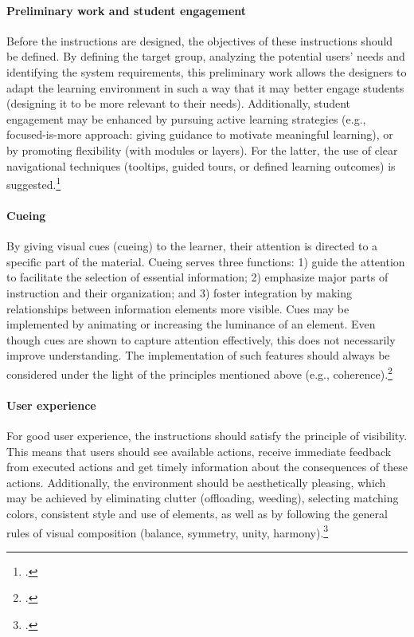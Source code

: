\paragraph{Preliminary work and student engagement} Before the instructions are designed, the objectives of these instructions should be defined. By defining the target group, analyzing the potential users' needs and identifying the system requirements, this preliminary work allows the designers to adapt the learning environment in such a way that it may better engage students (designing it to be more relevant to their needs). Additionally, student engagement may be enhanced by pursuing active learning strategies (e.g., focused-is-more approach: giving guidance to motivate meaningful learning), or by promoting flexibility (with modules or layers). For the latter, the use of clear navigational techniques (tooltips, guided tours, or defined learning outcomes) is suggested.\footcites[Cf.][p.202]{BlummerBestPracticesCreating2009}

\paragraph{Cueing} By giving visual cues (cueing) to the learner, their attention is directed to a specific part of the material. Cueing serves three functions: 1) guide the attention to facilitate the selection of essential information; 2) emphasize major parts of instruction and their organization; and 3) foster integration by making relationships between information elements more visible. Cues may be implemented by animating or increasing the luminance of an element. Even though cues are shown to capture attention effectively, this does not necessarily improve understanding. The implementation of such features should always be considered under the light of the principles mentioned above (e.g., coherence).\footcites[Cf.][p.114 et seqq]{deKoningFrameworkAttentionCueing2009}[cf.][chapter 2, paragraph 14]{ClarkElearningscienceinstruction2016}

\paragraph{User experience} For good user experience, the instructions should satisfy the principle of visibility. This means that users should see available actions, receive immediate feedback from executed actions and get timely information about the consequences of these actions. Additionally, the environment should be aesthetically pleasing, which may be achieved by eliminating clutter (offloading, weeding), selecting matching colors, consistent style and use of elements, as well as by following the general rules of visual composition (balance, symmetry, unity, harmony).\footcites[Cf.][p. 16 et seqq]{LeeScreenDesignGuidelines1999}[cf.][p. 16 et seqq]{Nadelhoffer10BestPractices}[cf.][p.20]{KirshInteractivitymultimediainterfaces1997}

